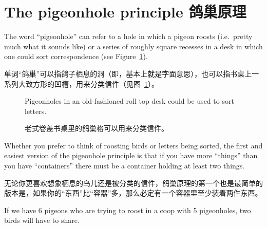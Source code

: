 
\clearpage





\clearpage


\section{The pigeonhole principle 鸽巢原理}
\label{sec:pigeonhole}

The word  ``pigeonhole'' can refer to a hole in which a pigeon roosts
(i.e.\ pretty much what it sounds like) or a series of roughly square 
recesses in a desk in which one could sort correspondence (see Figure~\ref{fig:roll_top}).

单词“鸽巢”可以指鸽子栖息的洞（即，基本上就是字面意思），也可以指书桌上一系列大致方形的凹槽，用来分类信件（见图~\ref{fig:roll_top}）。

\begin{figure}[!hbtp]
\begin{center}

\end{center}
\caption[A desk with pigeonholes.]{Pigeonholes in an old-fashioned roll top
desk could be used to sort letters.}
\caption[带鸽巢格的书桌。]{老式卷盖书桌里的鸽巢格可以用来分类信件。}
\label{fig:roll_top} 
\end{figure}

Whether you prefer to think of roosting birds or letters being sorted,
the first and easiest version of the  pigeonhole principle is that if you
have more ``things'' than you have ``containers'' there must be a container
holding at least two things.

无论你更喜欢想象栖息的鸟儿还是被分类的信件，鸽巢原理的第一个也是最简单的版本是，如果你的“东西”比“容器”多，那么必定有一个容器里至少装着两件东西。

If we have 6 pigeons who are trying to roost in a coop with 5 pigeonholes,
two birds will have to share.

